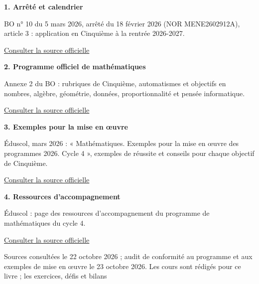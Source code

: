 \clearpage\thispagestyle{otFront}\label{references}\fontsize{11}{15}\selectfont
\par\medskip\textbf{1. Arrêté et calendrier}\par BO n° 10 du 5 mars 2026, arrêté du 18 février 2026 (NOR MENE2602912A), article 3 : application en Cinquième à la rentrée 2026-2027.\par\href{https://www.education.gouv.fr/bo/2026/Hebdo10/MENE2602912A}{\textcolor{otGreenDark}{Consulter la source officielle}}\par
\par\medskip\textbf{2. Programme officiel de mathématiques}\par Annexe 2 du BO : rubriques de Cinquième, automatismes et objectifs en nombres, algèbre, géométrie, données, proportionnalité et pensée informatique.\par\href{https://www.education.gouv.fr/sites/default/files/document/Annexe\%202\%20\%E2\%80\%93\%20Programme\%20de\%20math\%C3\%A9matiques\%20pour\%20le\%20cycle\%204-480716.pdf}{\textcolor{otGreenDark}{Consulter la source officielle}}\par
\par\medskip\textbf{3. Exemples pour la mise en œuvre}\par Éduscol, mars 2026 : « Mathématiques. Exemples pour la mise en œuvre des programmes 2026. Cycle 4 », exemples de réussite et conseils pour chaque objectif de Cinquième.\par\href{https://eduscol.education.gouv.fr/sites/default/files/document/exemple-mise-en-oeuvre-c4-mathematiques0pdf-126080.pdf}{\textcolor{otGreenDark}{Consulter la source officielle}}\par
\par\medskip\textbf{4. Ressources d’accompagnement}\par Éduscol : page des ressources d’accompagnement du programme de mathématiques du cycle 4.\par\href{https://eduscol.education.gouv.fr/5736/ressources-d-accompagnement-du-programme-de-mathematiques-au-cycle-4}{\textcolor{otGreenDark}{Consulter la source officielle}}\par
\par\bigskip Sources consultées le 22 octobre 2026 ; audit de conformité
au programme et aux exemples de mise en œuvre le 23 octobre 2026.
Les cours sont rédigés pour ce livre ; les exercices, défis et bilans
